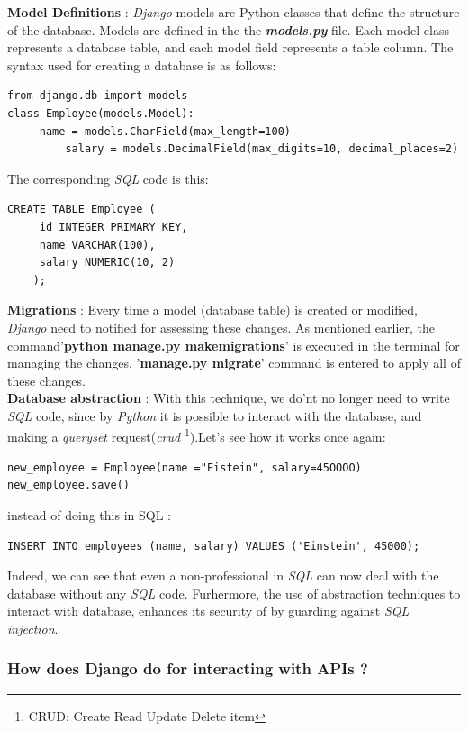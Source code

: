\documentclass[12pt,a4paper]{report}
\begin{document}
\textbf{Model Definitions} : \textit{Django} models are Python classes that define the structure of the database. Models are defined in the the \textbf{\textit{models.py}} file. Each model class represents a database table, and each model field represents a table column. The syntax used for creating a database is as follows: 
\begin{lstlisting}[style=stylepython]
from django.db import models
class Employee(models.Model):
     name = models.CharField(max_length=100)
	     salary = models.DecimalField(max_digits=10, decimal_places=2)
\end{lstlisting} 
The corresponding \textit{SQL} code is this:  
\begin{lstlisting}[style=stylepython]
	CREATE TABLE Employee (
	 id INTEGER PRIMARY KEY,
	 name VARCHAR(100),
	 salary NUMERIC(10, 2)
	);
\end{lstlisting}  

 \textbf{Migrations} : Every time a model (database table) is created or modified, \textit{Django} need to notified for assessing these changes. As mentioned earlier, the command'\textbf{python manage.py makemigrations}' is executed in the terminal for managing the changes,  '\textbf{manage.py migrate}' command is entered to apply all of these changes.   \\
 
\textbf{Database abstraction} : With this technique, we do'nt no longer need to write \textit{SQL} code, since by \textit{Python} it is possible to interact with the database, and making a \textit{queryset} request(\textit{crud}  \footnote{CRUD: Create Read Update Delete item}).Let's see how it works once again: 

\begin{lstlisting}[style=stylepython]
new_employee = Employee(name ="Eistein", salary=45OOOO) 
new_employee.save()
\end{lstlisting} 
instead of doing this in SQL : 
\begin{lstlisting}[style=stylepython]
INSERT INTO employees (name, salary) VALUES ('Einstein', 45000);
\end{lstlisting}  

Indeed, we can see that even a non-professional in \textit{SQL} can now deal with the database without any \textit{SQL} code. \newline
Furhermore, the use of abstraction techniques to interact with database, enhances its security of by guarding against \textit{SQL injection}. 
\subsubsection{How does Django do for interacting with APIs ?}
\end{document}
